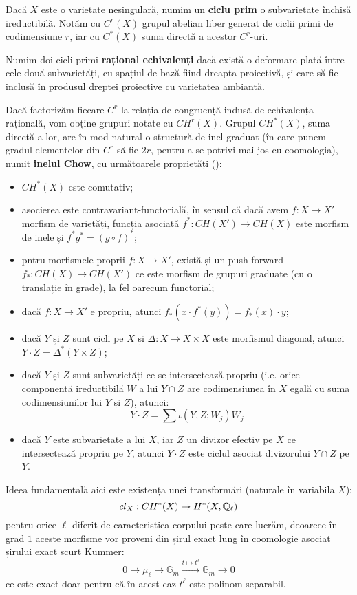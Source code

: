 \documentclass[13pt,openany,oneside]{book}
\begin{document}
Dacă $X$ este o varietate nesingulară, numim un {\bf ciclu prim} o subvarietate închisă ireductibilă. Notăm cu $C^r(X)$ grupul abelian liber generat de ciclii primi de codimensiune $r$, iar cu $C^*(X)$ suma directă a acestor $C^r$-uri.

Numim doi cicli primi {\bf rațional echivalenți} dacă există o deformare plată între cele două subvarietăți, cu spațiul de bază fiind dreapta proiectivă, și care să fie inclusă în produsul dreptei proiective cu varietatea ambiantă.

Dacă factorizăm fiecare $C^r$ la relația de congruență indusă de echivalența rațională, vom obține grupuri notate cu $CH^r(X)$. Grupul $CH^*(X)$, suma directă a lor, are în mod natural o structură de inel graduat (în care punem gradul elementelor din $C^r$ să fie $2r$, pentru a se potrivi mai jos cu coomologia), numit {\bf inelul Chow}, cu următoarele proprietăți (\cite{hart}):
\begin{itemize}
\item $CH^*(X)$ este comutativ;
\item asocierea este contravariant-functorială, în sensul că dacă avem $f: X \rightarrow X'$ morfism de varietăți, funcția asociată $f^*:CH(X') \rightarrow CH(X)$ este morfism de inele și $f^*g^* = (g \circ f)^*$;
\item pntru morfismele proprii $f: X \rightarrow X'$, există și un push-forward $f_*:CH(X) \rightarrow CH(X')$ ce este morfism de grupuri graduate (cu o translație în grade), la fel oarecum functorial;
\item dacă $f: X \rightarrow X'$ e propriu, atunci $f_*(x \cdot f^*(y)) = f_*(x) \cdot y$;
\item dacă $Y$ și $Z$ sunt cicli pe $X$ și $\Delta: X \rightarrow X \times X$ este morfismul diagonal, atunci $Y \cdot Z = \Delta^*(Y \times Z)$;
\item dacă $Y$ și $Z$ sunt subvarietăți ce se intersectează propriu (i.e. orice componentă ireductibilă $W$ a lui $Y \cap Z$ are codimensiunea în $X$ egală cu suma codimensiunilor lui $Y$ și $Z$), atunci:
$$Y \cdot Z = \sum \iota(Y,Z;W_j) W_j$$
\item dacă $Y$ este subvarietate a lui $X$, iar $Z$ un divizor efectiv pe $X$ ce intersectează propriu pe $Y$, atunci $Y \cdot Z$ este ciclul asociat divizorului $Y \cap Z$ pe $Y$.
\end{itemize}

Ideea fundamentală aici este existența unei transformări (naturale în variabila $X$):
$$cl_X : CH^*(X) \rightarrow H^*(X,\mathbb{Q}_\ell)$$
pentru orice $\ell$ diferit de caracteristica corpului peste care lucrăm, deoarece în grad $1$ aceste morfisme vor proveni din șirul exact lung în coomologie asociat șirului exact scurt Kummer:
$$0 \to \mu_\ell \to \mathbb{G}_m \xrightarrow{t\mapsto t^\ell} \mathbb{G}_m \to 0$$
ce este exact doar pentru că în acest caz $t^\ell$ este polinom separabil.
\end{document}
